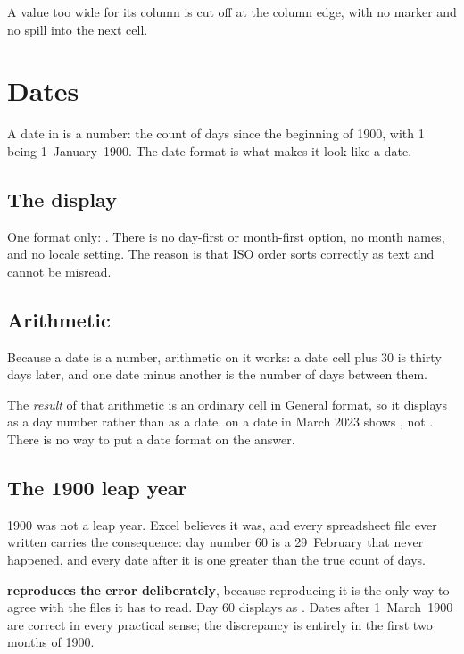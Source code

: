 A value too wide for its column is cut off at the column edge, with no
\lit{\#\#\#\#} marker and no spill into the next cell.

\section{Dates}

A date in \ccprod{} is a number: the count of days since the beginning of 1900,
with 1 being 1~January~1900. The date format is what makes it look like a date.

\subsection{The display}

One format only: \textbf{}. There is no day-first or month-first
option, no month names, and no locale setting. The reason is that ISO order
sorts correctly as text and cannot be misread.

\subsection{Arithmetic}

Because a date is a number, arithmetic on it works: a date cell plus 30 is
thirty days later, and one date minus another is the number of days between
them.

\begin{cccaution}
The \emph{result} of that arithmetic is an ordinary cell in General format, so
it displays as a day number rather than as a date.  on a date in
March 2023 shows , not . There is no way to put a
date format on the answer.
\end{cccaution}

\subsection{The 1900 leap year}

\begin{ccnote}
1900 was not a leap year. Excel believes it was, and every spreadsheet file
ever written carries the consequence: day number 60 is a 29~February that never
happened, and every date after it is one greater than the true count of days.

\ccprod{} \textbf{reproduces the error deliberately}, because reproducing it is
the only way to agree with the files it has to read. Day 60 displays as
. Dates after 1~March~1900 are correct in every practical
sense; the discrepancy is entirely in the first two months of 1900.
\end{ccnote}

